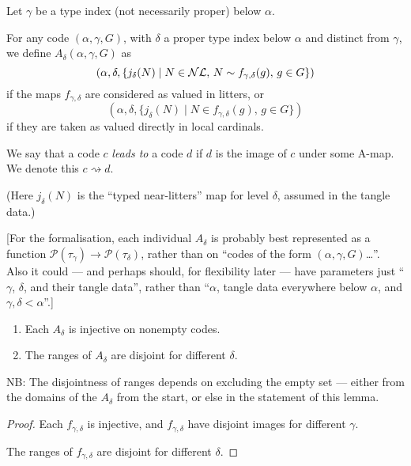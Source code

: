 \begin{definition}
\label {def:a-map}
\leanok
Let $\gamma$ be a type index (not necessarily proper) below $\alpha$.

For any code $(\alpha,\gamma,G)$, with $\delta$ a proper type index below $\alpha$ and distinct from $\gamma$, we define
$A_\delta(\alpha,\gamma,G)$ as
$$(\alpha,\delta,\{ j_\delta(N) \mid N \in \mathcal{NL},\, N \sim f_{\gamma,\delta}(g),\, g \in G \})$$
if the maps $f_{\gamma,\delta}$ are considered as valued in litters, or
$$(\alpha,\delta,\{ j_\delta(N) \mid N \in f_{\gamma,\delta}(g),\, g \in G \})$$
if they are taken as valued directly in local cardinals.

We say that a code $c$ \emph{leads to} a code $d$ if $d$ is the image of $c$ under some A-map. We denote this $c \rightsquigarrow d$.

(Here $j_\delta(N)$ is the “typed near-litters” map for level $\delta$, assumed in the tangle data.)

[For the formalisation, each individual $A_\delta$ is probably best represented as a function $\mathcal{P}(\tau_\gamma) \to \mathcal{P}(\tau_\delta)$, rather than on “codes of the form $(\alpha,\gamma,G)$…”.  Also it could — and perhaps should, for flexibility later — have parameters just “$\gamma$, $\delta$, and their tangle data”, rather than “$\alpha$, tangle data everywhere below $\alpha$, and $\gamma,\delta < \alpha$”.]
\end{definition}

\begin{lemma}
\label {lem:a-map-properties}
\leanok
\begin{enumerate}
\item Each $A_\delta$ is injective on nonempty codes.
\item The ranges of $A_\delta$ are disjoint for different $\delta$.
\end{enumerate}

NB: The disjointness of ranges depends on excluding the empty set --- either from the domains of the $A_\delta$ from the start, or else in the statement of this lemma.
\end{lemma}
\begin{proof}
\leanok
\item Each $f_{\gamma,\delta}$ is injective, and $f_{\gamma,\delta}$ have disjoint images for different $\gamma$.
\item The ranges of $f_{\gamma,\delta}$ are disjoint for different $\delta$.
\end{proof}

